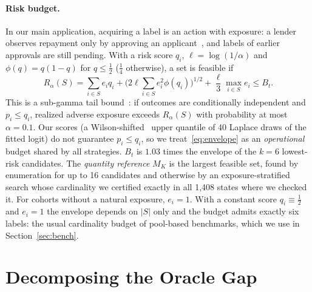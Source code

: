 \documentclass[runningheads]{llncs}
\begin{document}
\paragraph{Risk budget.} In our main application, acquiring a label is an action with exposure: a lender observes repayment only by approving an applicant~\cite{lakkaraju2017selective,wei2021selective}, and labels of earlier approvals are still pending. With a risk score $q_i$, $\ell=\log(1/\alpha)$ and $\phi(q)=q(1-q)$ for $q\le\frac12$ ($\frac14$ otherwise), a set is feasible if
\begin{equation}
 R_\alpha(S)=\sum_{i\in S}e_iq_i+\Big(2\ell\sum_{i\in S}e_i^2\phi(q_i)\Big)^{1/2}+\frac{\ell}{3}\max_{i\in S}e_i\le B_t .
 \label{eq:envelope}
\end{equation}
This is a sub-gamma tail bound~\cite{boucheron2013concentration}: if outcomes are conditionally independent and $p_i\le q_i$, realized adverse exposure exceeds $R_\alpha(S)$ with probability at most $\alpha=0.1$. Our scores (a Wilson-shifted~\cite{wilson1927probable} upper quantile of 40 Laplace draws of the fitted logit) do not guarantee $p_i\le q_i$, so we treat~\eqref{eq:envelope} as an \emph{operational} budget shared by all strategies. $B_t$ is $1.03$ times the envelope of the $k=6$ lowest-risk candidates. The \emph{quantity reference} $M_K$ is the largest feasible set, found by enumeration for up to 16 candidates and otherwise by an exposure-stratified search whose cardinality we certified exactly in all 1{,}408 states where we checked it. For cohorts without a natural exposure, $e_i=1$. With a constant score $q_i\equiv\frac12$ and $e_i=1$ the envelope depends on $|S|$ only and the budget admits exactly six labels: the usual cardinality budget of pool-based benchmarks, which we use in Section~\ref{sec:bench}.

\section{Decomposing the Oracle Gap}
\label{sec:protocol}
\end{document}

